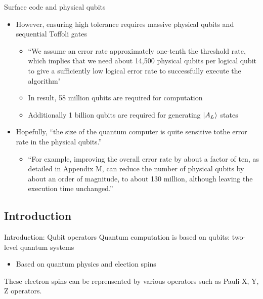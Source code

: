 \documentclass{beamer}
\begin{document}
    \begin{frame}{Surface code and physical qubits}
        \begin{itemize}
            \item However, ensuring high tolerance requires massive physical qubits and sequential Toffoli gates
            \begin{itemize}
                \item ``We assume an error rate approximately one-tenth the threshold rate, which implies that we need about 14,500 physical qubits per logical qubit to give a sufficiently low logical error rate to successfully execute the algorithm"
                \item In result, 58 million qubits are required for computation
                \item Additionally 1 billion qubits are required for generating $\ket{A_L}$ states
            \end{itemize}
            \item Hopefully, ``the size of the quantum computer is quite sensitive tothe error rate in the physical qubits.''
            \begin{itemize}
                \item ``For example, improving the overall error rate by about a factor of ten, as detailed in Appendix M, can reduce the number of physical qubits by about an order of magnitude, to about 130 million, although leaving the execution time unchanged.''
            \end{itemize} 
        \end{itemize}
    \end{frame}
    
    \subsection{Introduction}
    \begin{frame}{Introduction: Qubit operators}
        Quantum computation is based on qubits: two-level quantum systems
        \begin{itemize}
            \item Based on quantum physics and election spins
        \end{itemize}
        These electron spins can be reprensented by various operators such as Pauli-X, Y, Z operators.
    \end{frame} 
           
\end{document}
